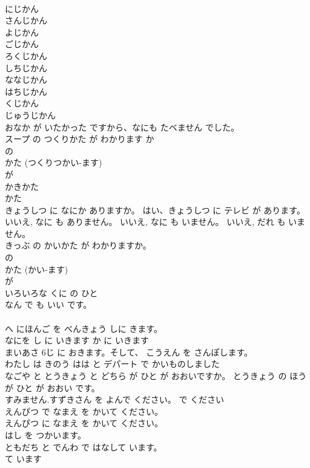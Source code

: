 \documentclass[8pt]{extreport}
\begin{document}
\begin{CJK}{UTF8}{min}
\\	にじかん	
\\	さんじかん	
\\	よじかん	
\\	ごじかん	
\\	ろくじかん	
\\	しちじかん 
\\	ななじかん	
\\	はちじかん	
\\	くじかん	
\\	じゅうじかん	
\\	おなか が いたかった ですから、なにも たベません でした。	
\\	スープ の つくりかた が わかります か	
\\	の 
\\	かた (つくりつかい-ます) 
\\	が 
\\	かきかた	
\\	かた
\\	きょうしつ に なにか ありますか。 はい、きょうしつ に テレビ が あります。	
\\	いいえ, なに も ありません。 いいえ, なに も いません。 いいえ, だれ も いません。	
\\	きっぶ の かいかた が わかりますか。	
\\	の 
\\	かた (かい-ます) 
\\	が 
\\	いろいろな くに の ひと	
\\	なん で も いい です。	
\\	[わたしは]
\\	へ にほんご を べんきょう しに きます。	
\\	なにを し に いきます か	に いきます
\\	まいあさ 6じ に おきます。そして、 こうえん を さんぽします。	
\\	わたし は きのう はは と デパート で かいものしました	
\\	なごや と とうきょう と どちら が ひと が おおいですか。 とうきょう の ほう が ひと が おおい です。	
\\	すみません.すずきさん を よんで ください。	で ください 
\\	えんぴつ で なまえ を かいて ください。	
\\	えんぴつ に なまえ を かいて ください。	
\\	はし を つかいます。	
\\	ともだち と でんわ で はなして います。	
\\	て います

\end{CJK}
\end{document}
